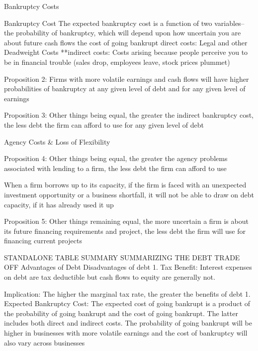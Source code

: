 \documentclass[10pt]{article}
\begin{document}
    \begin{core}{Bankruptcy Costs}

      Bankruptcy Cost
      The expected bankruptcy cost is a function of two variables–
      the probability of bankruptcy, which will depend upon how uncertain you are about future cash flows
      the cost of going bankrupt
      direct costs: Legal and other Deadweight Costs
      **indirect costs: Costs arising because people perceive you to be in financial trouble (sales drop, employees leave, stock prices plummet)

      Proposition 2: Firms with more volatile earnings and cash flows will have higher probabilities of bankruptcy at any given level of debt and for any given level of earnings

      Proposition 3: Other things being equal, the greater the indirect bankruptcy cost, the less debt the firm can afford to use for any given level of debt

    \end{core}

    \begin{core}{Agency Costs \& Loss of Flexibility}

      Proposition 4: Other things being equal, the greater the agency problems associated with lending to a firm, the less debt the firm can afford to use

      When a firm borrows up to its capacity, if the firm is faced with an unexpected investment opportunity or a business shortfall, it will not be able to draw on debt capacity, if it has already used it up

      Proposition 5: Other things remaining equal, the more uncertain a firm is about its future financing requirements and project, the less debt the firm will use for financing current projects

    \end{core}

    STANDALONE TABLE SUMMARY
    SUMMARIZING THE DEBT TRADE OFF
    Advantages of Debt
    Disadvantages of debt
    1. Tax Benefit: Interest expenses on debt are tax deductible but cash flows to equity are generally not.

    Implication: The higher the marginal tax rate, the greater the benefits of debt
    1. Expected Bankruptcy Cost: The expected cost of going bankrupt is a product of the probability of going bankrupt and the cost of going bankrupt. The latter includes both direct and indirect costs. The probability of going bankrupt will be higher in businesses with more volatile earnings and the cost of bankruptcy will also vary across businesses
\end{document}
